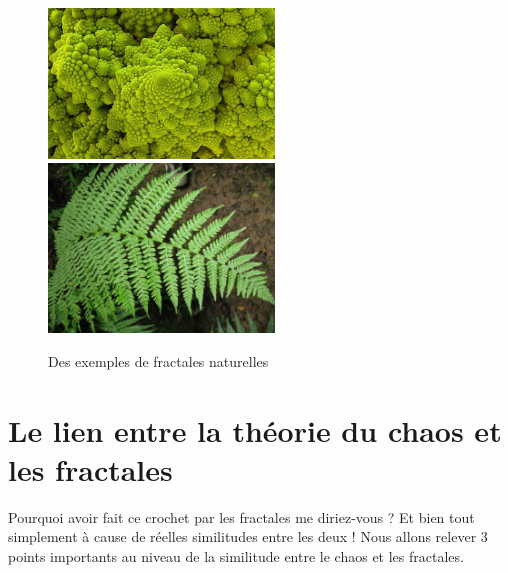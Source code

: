 \documentclass[french,11pt]{report}
\begin{document}
\begin{figure} [!h]
    \centering
    \includegraphics[width=6cm]{choux_fleur}
    \label{fig:choux_fleur}
    \includegraphics[width=6cm]{fougere}
    \label{fig:fougere}
    \caption{Des exemples de fractales naturelles}
\end{figure}

\chapter{Le lien entre la théorie du chaos et les fractales}

Pourquoi avoir fait ce crochet par les fractales me diriez-vous ? Et bien tout simplement à cause de réelles similitudes entre les deux !
Nous allons relever 3 points importants au niveau de la similitude entre le chaos et les fractales.
\end{document}
